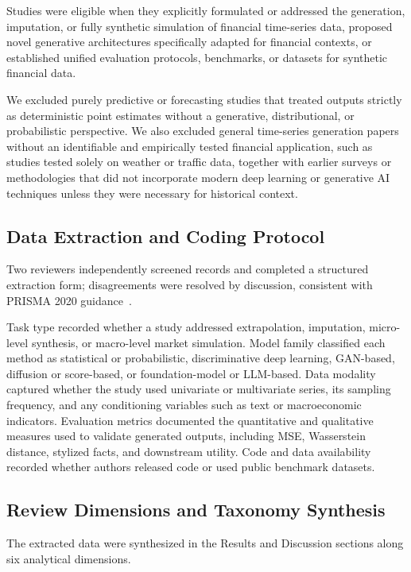 \documentclass[11pt,a4paper]{article}
\begin{document}
Studies were eligible when they explicitly formulated or addressed the generation, imputation, or fully synthetic simulation of financial time-series data, proposed novel generative architectures specifically adapted for financial contexts, or established unified evaluation protocols, benchmarks, or datasets for synthetic financial data.

We excluded purely predictive or forecasting studies that treated outputs strictly as deterministic point estimates without a generative, distributional, or probabilistic perspective. We also excluded general time-series generation papers without an identifiable and empirically tested financial application, such as studies tested solely on weather or traffic data, together with earlier surveys or methodologies that did not incorporate modern deep learning or generative AI techniques unless they were necessary for historical context.

\subsection{Data Extraction and Coding Protocol}
Two reviewers independently screened records and completed a structured extraction form; disagreements were resolved by discussion, consistent with PRISMA 2020 guidance~\citep{page2021prisma}.

Task type recorded whether a study addressed extrapolation, imputation, micro-level synthesis, or macro-level market simulation. Model family classified each method as statistical or probabilistic, discriminative deep learning, GAN-based, diffusion or score-based, or foundation-model or LLM-based. Data modality captured whether the study used univariate or multivariate series, its sampling frequency, and any conditioning variables such as text or macroeconomic indicators. Evaluation metrics documented the quantitative and qualitative measures used to validate generated outputs, including MSE, Wasserstein distance, stylized facts, and downstream utility. Code and data availability recorded whether authors released code or used public benchmark datasets.

\subsection{Review Dimensions and Taxonomy Synthesis}
The extracted data were synthesized in the Results and Discussion sections along six analytical dimensions.
\end{document}
